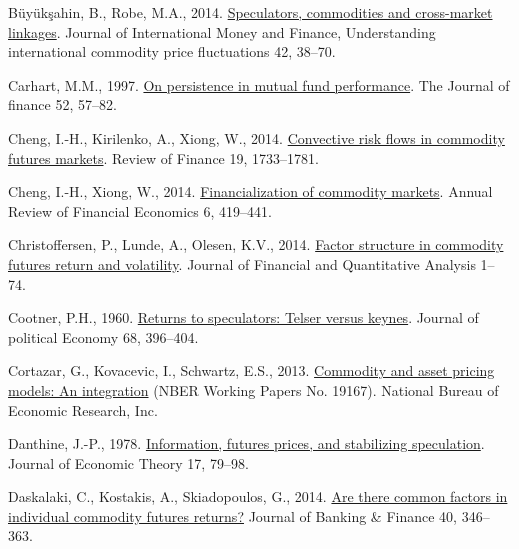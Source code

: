 \documentclass[]{elsarticle} %
\newlength{\cslhangindent}
\newlength{\cslentryspacingunit} %
\newenvironment{CSLReferences}[2] %
 {%
  \setlength{\parindent}{0pt}
  \ifodd #1
  \let\oldpar\par
  \def\par{\hangindent=\cslhangindent\oldpar}
  \fi
  \setlength{\parskip}{#2\cslentryspacingunit}
 }%
 {}
\begin{document}
\begin{CSLReferences}{1}{0}
\leavevmode{}%
Büyükşahin, B., Robe, M.A., 2014. \href{https://doi.org/10.1016/j.jimonfin.2013.08.004}{Speculators, commodities and cross-market linkages}. Journal of International Money and Finance, Understanding international commodity price fluctuations 42, 38--70.

\leavevmode{}%
Carhart, M.M., 1997. \href{https://doi.org/10.2307/2329556}{On persistence in mutual fund performance}. The Journal of finance 52, 57--82.

\leavevmode{}%
Cheng, I.-H., Kirilenko, A., Xiong, W., 2014. \href{https://doi.org/10.1093/rof/rfu043}{Convective risk flows in commodity futures markets}. Review of Finance 19, 1733--1781.

\leavevmode{}%
Cheng, I.-H., Xiong, W., 2014. \href{https://doi.org/10.1146/annurev-financial-110613-034432}{Financialization of commodity markets}. Annual Review of Financial Economics 6, 419--441.

\leavevmode{}%
Christoffersen, P., Lunde, A., Olesen, K.V., 2014. \href{https://doi.org/10.1017/S0022109018000765}{Factor structure in commodity futures return and volatility}. Journal of Financial and Quantitative Analysis 1--74.

\leavevmode{}%
Cootner, P.H., 1960. \href{https://doi.org/10.1086/258347}{Returns to speculators: Telser versus keynes}. Journal of political Economy 68, 396--404.

\leavevmode{}%
Cortazar, G., Kovacevic, I., Schwartz, E.S., 2013. \href{https://ssrn.com/abstract=2287027}{Commodity and asset pricing models: An integration} (NBER Working Papers No. 19167). National Bureau of Economic Research, Inc.

\leavevmode{}%
Danthine, J.-P., 1978. \href{https://doi.org/10.1016/0022-0531(78)90124-2}{Information, futures prices, and stabilizing speculation}. Journal of Economic Theory 17, 79--98.

\leavevmode{}%
Daskalaki, C., Kostakis, A., Skiadopoulos, G., 2014. \href{https://doi.org/10.1016/j.jbankfin.2013.11.034}{Are there common factors in individual commodity futures returns?} Journal of Banking {\&} Finance 40, 346--363.


\end{CSLReferences}
\end{document}
